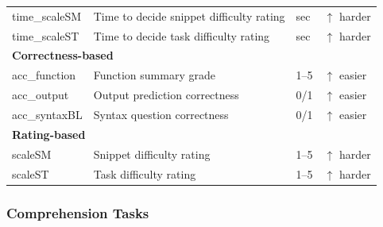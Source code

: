 \begin{table}[t]
\begin{tabularx}{\columnwidth}{l X l l}
time\_scaleSM & Time to decide snippet difficulty rating & sec & $\uparrow$ harder \\

time\_scaleST & Time to decide task difficulty rating & sec & $\uparrow$ harder \\

\midrule

\multicolumn{4}{l}{\textbf{Correctness-based}} \\

acc\_function & Function summary grade & 1--5 & $\uparrow$ easier \\

acc\_output & Output prediction correctness & 0/1 & $\uparrow$ easier \\

acc\_syntaxBL & Syntax question correctness & 0/1 & $\uparrow$ easier \\

\midrule

\multicolumn{4}{l}{\textbf{Rating-based}} \\

scaleSM & Snippet difficulty rating & 1--5 & $\uparrow$ harder \\

scaleST & Task difficulty rating & 1--5 & $\uparrow$ harder \\

\bottomrule
\end{tabularx}
\end{table}
 
\subsubsection{Comprehension Tasks}

